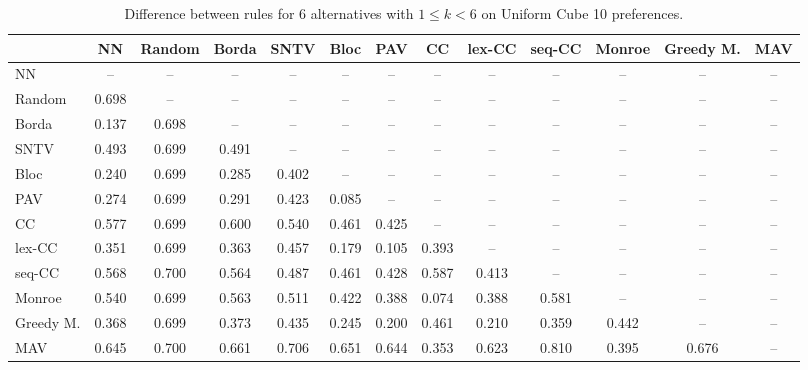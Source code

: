 
\begin{table*}[h!]
\centering
\begin{tabular}{lcccccccccccc}
\toprule
 & NN & Random & Borda & SNTV & Bloc & PAV & CC & lex-CC & seq-CC & Monroe & Greedy M. & MAV \\
\midrule
NN & -- & -- & -- & -- & -- & -- & -- & -- & -- & -- & -- & -- \\
Random & 0.698 & -- & -- & -- & -- & -- & -- & -- & -- & -- & -- & -- \\
Borda & 0.137 & 0.698 & -- & -- & -- & -- & -- & -- & -- & -- & -- & -- \\
SNTV & 0.493 & 0.699 & 0.491 & -- & -- & -- & -- & -- & -- & -- & -- & -- \\
Bloc & 0.240 & 0.699 & 0.285 & 0.402 & -- & -- & -- & -- & -- & -- & -- & -- \\
PAV & 0.274 & 0.699 & 0.291 & 0.423 & 0.085 & -- & -- & -- & -- & -- & -- & -- \\
CC & 0.577 & 0.699 & 0.600 & 0.540 & 0.461 & 0.425 & -- & -- & -- & -- & -- & -- \\
lex-CC & 0.351 & 0.699 & 0.363 & 0.457 & 0.179 & 0.105 & 0.393 & -- & -- & -- & -- & -- \\
seq-CC & 0.568 & 0.700 & 0.564 & 0.487 & 0.461 & 0.428 & 0.587 & 0.413 & -- & -- & -- & -- \\
Monroe & 0.540 & 0.699 & 0.563 & 0.511 & 0.422 & 0.388 & 0.074 & 0.388 & 0.581 & -- & -- & -- \\
Greedy M. & 0.368 & 0.699 & 0.373 & 0.435 & 0.245 & 0.200 & 0.461 & 0.210 & 0.359 & 0.442 & -- & -- \\
MAV & 0.645 & 0.700 & 0.661 & 0.706 & 0.651 & 0.644 & 0.353 & 0.623 & 0.810 & 0.395 & 0.676 & -- \\
\bottomrule
\end{tabular}

\caption{Difference between rules for 6 alternatives with $1 \leq k < 6$ on Uniform Cube 10 preferences.}
\end{table*}
